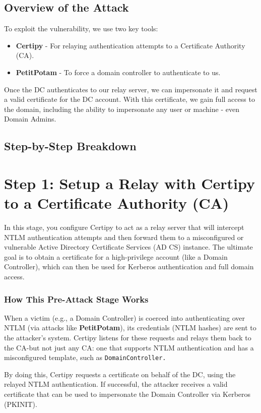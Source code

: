 \subsection{Overview of the Attack}
To exploit the vulnerability, we use two key tools:
\begin{itemize}
    \item \textbf{Certipy} - For relaying authentication attempts to a Certificate Authority (CA).
    \item \textbf{PetitPotam} - To force a domain controller to authenticate to us.
\end{itemize}

Once the DC authenticates to our relay server, we can impersonate it and request a valid certificate for the DC account. With this certificate, we gain full access to the domain, including the ability to impersonate any user or machine - even Domain Admins.

\subsection{Step-by-Step Breakdown}
\section{Step 1: Setup a Relay with Certipy to a Certificate Authority (CA)}
In this stage, you configure Certipy to act as a relay server that will intercept NTLM authentication attempts and then forward them to a misconfigured or vulnerable Active Directory Certificate Services (AD CS) instance. The ultimate goal is to obtain a certificate for a high-privilege account (like a Domain Controller), which can then be used for Kerberos authentication and full domain access.

\subsubsection{How This Pre-Attack Stage Works}
When a victim (e.g., a Domain Controller) is coerced into authenticating over NTLM (via attacks like \textbf{PetitPotam}), its credentials (NTLM hashes) are sent to the attacker's system. Certipy listens for these requests and relays them back to the CA-but not just any CA: one that supports NTLM authentication and has a misconfigured template, such as \verb|DomainController.|

By doing this, Certipy requests a certificate on behalf of the DC, using the relayed NTLM authentication. If successful, the attacker receives a valid certificate that can be used to impersonate the Domain Controller via Kerberos (PKINIT).


